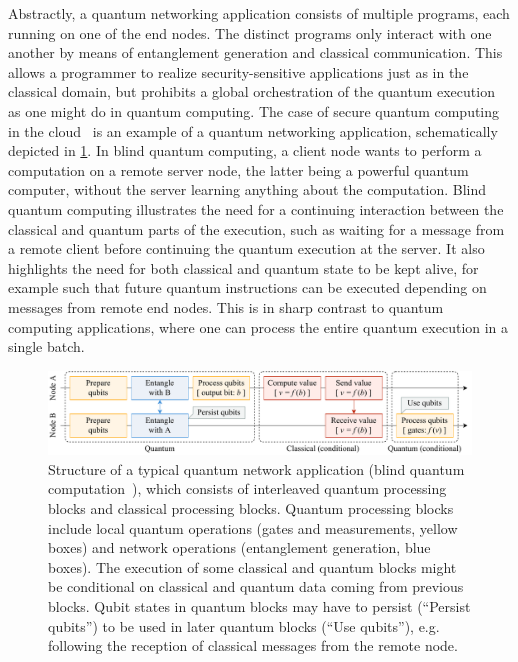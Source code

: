 Abstractly, a quantum networking application consists of multiple programs, each running on one of
the end nodes. The distinct programs only interact with one another by means of entanglement
generation and classical communication. This allows a programmer to realize security-sensitive
applications just as in the classical domain, but prohibits a global orchestration of the quantum
execution as one might do in quantum computing. The case of secure quantum computing in the
cloud~\cite{broadbent_2009_ubqc, childs_2005_secure_qc} is an example of a quantum networking
application, schematically depicted in \cref{fig:app-struct}. In blind quantum computing, a client
node wants to perform a computation on a remote server node, the latter being a powerful quantum
computer, without the server learning anything about the computation. Blind quantum computing
illustrates the need for a continuing interaction between the classical and quantum parts of the
execution, such as waiting for a message from a remote client before continuing the quantum
execution at the server. It also highlights the need for both classical and quantum state to be kept
alive, for example such that future quantum instructions can be executed depending on messages from
remote end nodes. This is in sharp contrast to quantum computing applications, where one can process
the entire quantum execution in a single batch.

\begin{figure}[t]
    \centering
    \includegraphics[width=\linewidth]{figures/app-struct.pdf}
    \caption{
        Structure of a typical quantum network application (blind quantum
        computation~\cite{broadbent_2009_ubqc, childs_2005_secure_qc}), which consists of
        interleaved quantum processing blocks and classical processing blocks. Quantum processing
        blocks include local quantum operations (gates and measurements, yellow boxes) and network
        operations (entanglement generation, blue boxes). The execution of some classical and
        quantum blocks might be conditional on classical and quantum data coming from previous
        blocks. Qubit states in quantum blocks may have to persist (``Persist qubits'') to be used
        in later quantum blocks (``Use qubits''), e.g. following the reception of classical messages
        from the remote node.
    }
    \label{fig:app-struct}
\end{figure}

